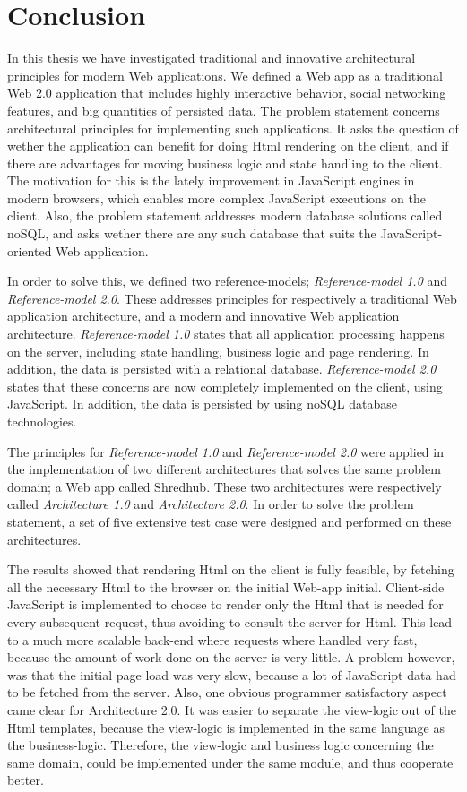 \chapter{Conclusion}
In this thesis we have investigated traditional and innovative architectural principles for modern Web applications. We defined a Web app as a traditional Web 2.0 application that includes highly interactive behavior, social networking features, and big quantities of persisted data. The problem statement concerns architectural principles for implementing such applications. It asks the question of wether the application can benefit for doing Html rendering on the client, and if there are advantages for moving business logic and state handling to the client. The motivation for this is the lately improvement in JavaScript engines in modern browsers, which enables more complex JavaScript executions on the client. Also, the problem statement addresses modern database solutions called noSQL, and asks wether there are any such database that suits the JavaScript-oriented Web application.

In order to solve this, we defined two reference-models; \textit{Reference-model 1.0} and \textit{Reference-model 2.0}. These addresses principles for respectively a traditional Web application architecture, and a modern and innovative Web application architecture. \textit{Reference-model 1.0} states that all application processing happens on the server, including state handling, business logic and page rendering. In addition, the data is persisted with a relational database. \textit{Reference-model 2.0} states that these concerns are now completely implemented on the client, using JavaScript. In addition, the data is persisted by using noSQL database technologies. 

The principles for \textit{Reference-model 1.0} and \textit{Reference-model 2.0} were applied in the implementation of two different architectures that solves the same problem domain; a Web app called Shredhub. These two architectures were respectively called \textit{Architecture 1.0} and \textit{Architecture 2.0}. In order to solve the problem statement, a set of five extensive test case were designed and performed on these architectures. 

The results showed that rendering Html on the client is fully feasible, by fetching all the necessary Html to the browser on the initial Web-app initial. Client-side JavaScript is implemented to choose to render only the Html that is needed for every subsequent request, thus avoiding to consult the server for Html. This lead to a much more scalable back-end where requests where handled very fast, because the amount of work done on the server is very little. A problem however, was that the initial page load was very slow, because a lot of JavaScript data had to be fetched from the server. Also, one obvious programmer satisfactory aspect came clear for Architecture 2.0. It was easier to separate the view-logic out of the Html templates, because the view-logic is implemented in the same language as the business-logic. Therefore, the view-logic and business logic concerning the same domain, could be implemented under the same module, and thus cooperate better.  

